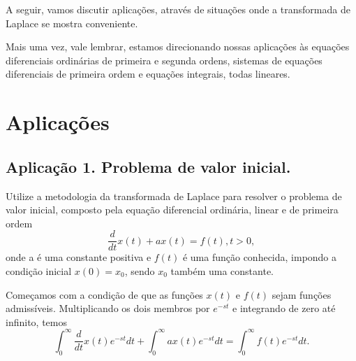 

A seguir, vamos discutir aplicações, através de situações onde a transformada de Laplace se mostra conveniente.

Mais uma vez, vale lembrar, estamos direcionando nossas aplicações às equações diferenciais ordinárias de primeira e segunda ordens, sistemas de equações diferenciais de primeira ordem e equações integrais, todas lineares.

\section{Aplicações}

\subsection{Aplicação 1. Problema de valor inicial.}

Utilize a metodologia da transformada de Laplace para resolver o problema de valor inicial, composto pela equação diferencial ordinária, linear e de primeira ordem
$$\dfrac{d}{dt} x(t) + ax(t) = f(t), t > 0,$$
onde a é uma constante positiva e $f(t)$ é uma função conhecida, impondo a condição inicial $x(0) = x_0$, sendo $x_0$ também uma constante.

Começamos com a condição de que as funções $x(t)$ e $f(t)$ sejam funções admissíveis. Multiplicando os dois membros por $e^{-st}$ e integrando de zero até infinito, temos
$$\int_{0}^{\infty}
\dfrac{d}{dt}
x(t) e^{-st}dt
+
\int_{0}^{\infty} a x(t) e^{-st} dt
=
\int_{0}^{\infty}
f(t) e^{-st}dt.$$

